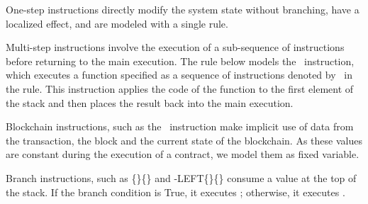 \documentclass[runningheads]{llncs}
\begin{document}
One-step instructions directly modify the system state without branching, have a localized effect, and are modeled with a single rule.

Multi-step instructions involve the execution of a sub-sequence of instructions before returning to the main execution. The rule below models the \EXEC\ instruction, which executes a function specified as a sequence of instructions denoted by \INSTRUCTIONONE\ in the rule. This instruction applies the code of the function to the first element of the stack and then places the result back into the main execution.
\begin{mathpar}
\end{mathpar}
 
Blockchain instructions, such as the \AMOUNT\
 instruction make implicit use of data from the transaction, the block and the current state of the blockchain. As these values are constant during the execution of a contract, we model them as fixed variable. 

Branch instructions, such as \IF\{\INSTRUCTIONONE\}\{\INSTRUCTIONTWO\} and \IF-LEFT\{\INSTRUCTIONONE\}\{\INSTRUCTIONTWO\} consume a value at the top of the stack. If the branch condition
is True, it executes \INSTRUCTIONONE; otherwise, it executes
\INSTRUCTIONTWO. 
\end{document}
